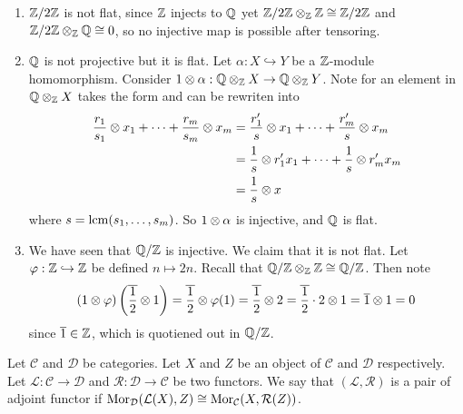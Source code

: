 \begin{ex}
    \hfill

    \begin{enumerate}
        \item ${\mathbb Z}/2{\mathbb Z}$ is not flat, since ${\mathbb Z}$ injects to ${\mathbb Q}$ yet ${\mathbb Z}/2{\mathbb Z} \otimes_{\mathbb Z} {\mathbb Z} \cong {\mathbb Z}/2{\mathbb Z}$ and ${\mathbb Z}/2{\mathbb Z} \otimes_{\mathbb Z} {\mathbb Q} \cong 0$, so no injective map is possible after tensoring.
        \item ${\mathbb Q}$ is not projective but it is flat. Let $\alpha:X\hookrightarrow Y$ be a ${\mathbb Z}$-module homomorphism. Consider $1\otimes\alpha:{\mathbb Q}\otimes_{\mathbb Z} X \to {\mathbb Q}\otimes_{\mathbb Z} Y$. Note for an element in ${\mathbb Q}\otimes_{\mathbb Z} X$ takes the form and can be rewriten into
        \begin{align*}
            \frac{r_1}{s_1} \otimes x_1 + \dots + \frac{r_m}{s_m} \otimes x_m 
            &= \frac{r_1'}{s} \otimes x_1 +\dots+ \frac{r_m'}{s} \otimes x_m \\
            &= \frac{1}{s} \otimes r'_1x_1 +\dots+ \frac{1}{s}\otimes r'_mx_m \\
            &= \frac{1}{s} \otimes x
        \end{align*}
        where $s= \operatorname{lcm}(s_1 ,\dots, s_m)$. So $1\otimes\alpha$ is injective, and ${\mathbb Q}$ is flat.
        \item We have seen that ${\mathbb Q}/{\mathbb Z}$ is injective. We claim that it is not flat. Let $\varphi:{\mathbb Z}\hookrightarrow{\mathbb Z}$ be defined $n\mapsto 2n$. Recall that ${\mathbb Q}/{\mathbb Z} \otimes_{\mathbb Z} {\mathbb Z} \cong {\mathbb Q}/{\mathbb Z}$. Then note
        \[(1\otimes\varphi)\left(\overline{\frac{1}{2}}\otimes 1\right) = \overline{\frac{1}{2}} \otimes \varphi(1) = \overline{\frac{1}{2}} \otimes 2 = \overline{\frac{1}{2}}\cdot 2 \otimes 1 = \overline{1} \otimes 1= 0\]
        since $\overline{1} \in {\mathbb Z}$, which is quotiened out in ${\mathbb Q}/{\mathbb Z}$.
    \end{enumerate}
\end{ex}

\medskip

\begin{defn} 
    Let $\mathcal C$ and $\mathcal D$ be categories. Let $X$ and $Z$ be an object of $\mathcal C$ and $\mathcal D$ respectively. Let $\mathcal L:\mathcal C\to \mathcal D$ and $\mathcal R: \mathcal D\to \mathcal C$ be two functors.  We say that $(\mathcal L, \mathcal R)$ is a pair of adjoint functor if $\operatorname{Mor}_\mathcal D(\mathcal L(X),Z)\cong \operatorname{Mor}_\mathcal C (X,\mathcal R(Z))$.
\end{defn}

\medskip

